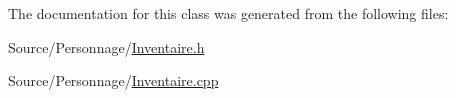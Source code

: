 The documentation for this class was generated from the following files\-:\begin{DoxyCompactItemize}
\item 
Source/\-Personnage/\hyperlink{Inventaire_8h}{Inventaire.\-h}\item 
Source/\-Personnage/\hyperlink{Inventaire_8cpp}{Inventaire.\-cpp}\end{DoxyCompactItemize}
